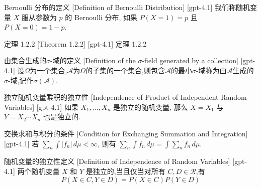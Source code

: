 \documentclass[UTF8]{ctexart}
\begin{document}
    
    
    \begin{dfn}
        {Bernoulli 分布的定义}
        [Definition of Bernoulli Distribution]
        [gpt-4.1]
        我们称随机变量 $X$ 服从参数为 $p$ 的 Bernoulli 分布, 如果 $P(X = 1) = p$ 且 $P(X = 0) = 1 - p$.
    \end{dfn}
    
    
    
    \begin{thm}
        [Theorem-1.2.2]
        {定理 1.2.2}
        [Theorem 1.2.2]
        [gpt-4.1]
        定理 1.2.2
    \end{thm}
    
    
    
    \begin{dfn}
        {由集合生成的$\sigma$-域的定义}
        [Definition of the $\sigma$-field generated by a collection]
        [gpt-4.1]
        设$\Omega$为一个集合,$\mathcal{A}$为$\Omega$的子集的一个集合,则包含$\mathcal{A}$的最小$\sigma$-域称为由$\mathcal{A}$生成的$\sigma$-域,记作$\sigma(\mathcal{A})$.
    \end{dfn}
    
    
    
    \begin{thm}
        {独立随机变量乘积的独立性}
        [Independence of Product of Independent Random Variables]
        [gpt-4.1]
        如果 $X_1, \ldots, X_n$ 是独立的随机变量, 那么 $X = X_1$ 与 $Y = X_2 \cdots X_n$ 也是独立的.
    \end{thm}
    
    
    
    \begin{thm}
        {交换求和与积分的条件}
        [Condition for Exchanging Summation and Integration]
        [gpt-4.1]
        若 $\sum_n \int |f_n| \, d\mu < \infty$, 则有 $\sum_n \int f_n \, d\mu = \int \sum_n f_n \, d\mu$.

    \end{thm}
    
    
    
    \begin{dfn}
        {随机变量的独立性定义}
        [Definition of Independence of Random Variables]
        [gpt-4.1]
        两个随机变量 $X$ 和 $Y$ 是独立的,当且仅当对所有 $C, D \in \mathcal{R}$,有
\[
P(X \in C, Y \in D) = P(X \in C) P(Y \in D)
\]

    \end{dfn}
    
\end{document}
